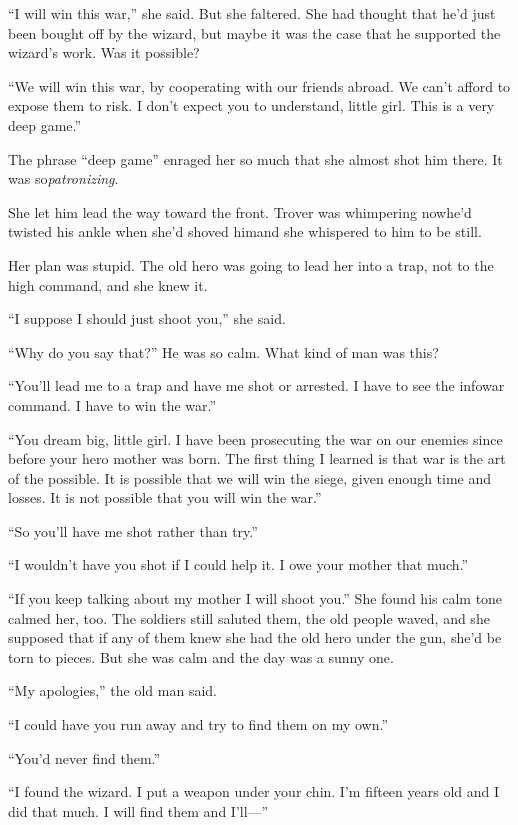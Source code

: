“I will win this war,” she said. But she faltered. She had thought
that he’d just been bought off by the wizard, but maybe it was the
case that he supported the wizard’s work. Was it possible?

“We will win this war, by cooperating with our friends abroad. We
can’t afford to expose them to risk. I don’t expect you to
understand, little girl. This is a very deep game.”

The phrase “deep game” enraged her so much that she almost shot him
there. It was so\dash{}\emph{patronizing}.

She let him lead the way toward the front. Trover was whimpering
now\dash{}he’d twisted his ankle when she’d shoved him\dash{}and she whispered
to him to be still.

Her plan was stupid. The old hero was going to lead her into a
trap, not to the high command, and she knew it.

“I suppose I should just shoot you,” she said.

“Why do you say that?” He was so calm. What kind of man was this?

“You’ll lead me to a trap and have me shot or arrested. I have to
see the infowar command. I have to win the war.”

“You dream big, little girl. I have been prosecuting the war on our
enemies since before your hero mother was born. The first thing I
learned is that war is the art of the possible. It is possible that
we will win the siege, given enough time and losses. It is not
possible that you will win the war.”

“So you’ll have me shot rather than try.”

“I wouldn’t have you shot if I could help it. I owe your mother
that much.”

“If you keep talking about my mother I will shoot you.” She found
his calm tone calmed her, too. The soldiers still saluted them, the
old people waved, and she supposed that if any of them knew she had
the old hero under the gun, she’d be torn to pieces. But she was
calm and the day was a sunny one.

“My apologies,” the old man said.

“I could have you run away and try to find them on my own.”

“You’d never find them.”

“I found the wizard. I put a weapon under your chin. I’m fifteen
years old and I did that much. I will find them and I’ll---”


